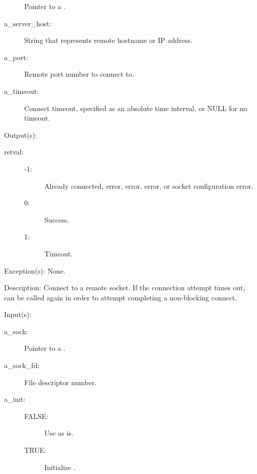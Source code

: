 \begin{capi}
\begin{capilist}
\begin{description}
			Pointer to a .
		\item[a\_server\_host: ]
			String that represents remote hostname or IP address.
		\item[a\_port: ]
			Remote port number to connect to.
		\item[a\_timeout: ]
			Connect timeout, specified as an absolute time interval,
			or NULL for no timeout.
		\end{description}
	\item[Output(s): ]
		\begin{description}\item[]
		\item[retval: ]
			\begin{description}\item[]
			\item[-1: ]
				Already connected,  error,
				 error,  error,
				or socket configuration error.
			\item[0: ]
				Success.
			\item[1: ]
				Timeout.
			\end{description}
		\end{description}
	\item[Exception(s): ] None.
	\item[Description: ]
		Connect to a remote socket.  If the connection attempt times
		out,  can be called again in order to
		attempt completing a non-blocking connect.
	\end{capilist}
\label{sock_wrap}
	\begin{capilist}
	\item[Input(s): ]
		\begin{description}\item[]
		\item[a\_sock: ]
			Pointer to a .
		\item[a\_sock\_fd: ]
			File descriptor number.
		\item[a\_init: ]
			\begin{description}\item[]
			\item[FALSE: ] Use  as is.
			\item[TRUE: ] Initialize .
			\end{description}
		\end{description}

\end{capilist}
\end{capi}
